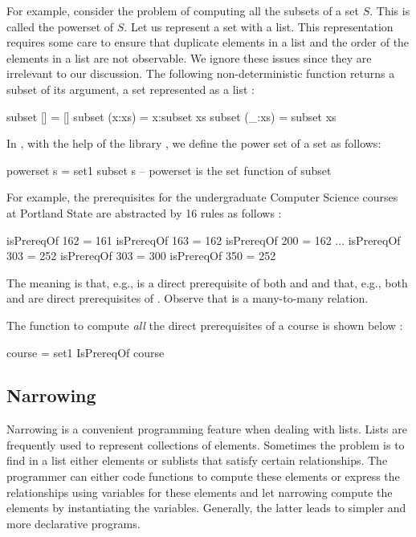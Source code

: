 For example, consider the problem of computing all the subsets
of a set $S$.  This is called the powerset of $S$. 
Let us represent a set with a list.
This representation requires some care to ensure that
duplicate elements in a list and
the order of the elements in a list are not observable.
We ignore these issues since they are irrelevant to our discussion.
The following non-deterministic function returns a
subset of its argument, a set represented as a list
:
%
\begin{curry}
subset []     = []
subset (x:xs) = x:subset xs
subset (_:xs) =   subset xs
\end{curry}
%
In \pakcs{}, with the help of the library ,
we define the power set of a set as follows:
%
\begin{curry}
powerset s = set1 subset s  -- powerset is the set function of subset
\end{curry}
%
For example, the prerequisites for the undergraduate 
Computer Science courses at Portland State
are abstracted by 16 rules as follows
:
%
\begin{curry}
isPrereqOf 162 = 161
isPrereqOf 163 = 162
isPrereqOf 200 = 162
...
isPrereqOf 303 = 252
isPrereqOf 303 = 300
isPrereqOf 350 = 252
\end{curry}
%
The meaning is that, e.g.,  is a direct prerequisite of both
 and  and that, e.g., 
both  and  are direct prerequisites of .
Observe that  is a many-to-many relation.

The function to compute \emph{all} the direct prerequisites
of a course is shown below
:
%
\begin{prog}
 course = set1 IsPrereqOf course
\end{prog}
%


\subsection{Narrowing}

Narrowing is a convenient programming feature when dealing with lists.
Lists are frequently used to represent collections of elements.
Sometimes the problem is to find in a list either elements
or sublists that satisfy certain relationships.
The programmer can either code functions to compute these elements
or express the relationships using variables for these elements
and let narrowing compute the elements by instantiating the variables.
Generally, the latter leads to simpler and more declarative programs.

